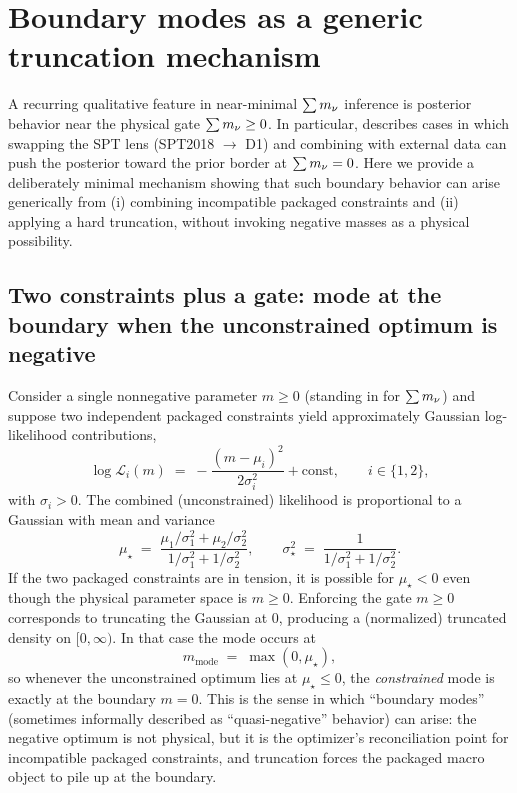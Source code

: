 \section{Boundary modes as a generic truncation mechanism}
\label{sec:boundary-mode}

A recurring qualitative feature in near-minimal $\sum m_\nu$ inference is posterior behavior near the physical gate $\sum m_\nu \ge 0$. In particular, \cite{arxiv2601_16277} describes cases in which swapping the SPT lens (SPT2018 $\rightarrow$ D1) and combining with external data can push the posterior toward the prior border at $\sum m_\nu=0$. Here we provide a deliberately minimal mechanism showing that such boundary behavior can arise generically from (i) combining incompatible packaged constraints and (ii) applying a hard truncation, without invoking negative masses as a physical possibility.

\subsection{Two constraints plus a gate: mode at the boundary when the unconstrained optimum is negative}
Consider a single nonnegative parameter $m \ge 0$ (standing in for $\sum m_\nu$) and suppose two independent packaged constraints yield approximately Gaussian log-likelihood contributions,
\begin{equation}
  \log \mathcal{L}_i(m) \;=\; -\frac{(m-\mu_i)^2}{2\sigma_i^2} + \text{const}, \qquad i\in\{1,2\},
  \label{eq:toy_gaussian_constraints}
\end{equation}
with $\sigma_i>0$. The combined (unconstrained) likelihood is proportional to a Gaussian with mean and variance
\begin{equation}
  \mu_\star \;=\; \frac{\mu_1/\sigma_1^2 + \mu_2/\sigma_2^2}{1/\sigma_1^2 + 1/\sigma_2^2},
  \qquad
  \sigma_\star^2 \;=\; \frac{1}{1/\sigma_1^2 + 1/\sigma_2^2}.
  \label{eq:toy_combined_gaussian}
\end{equation}
If the two packaged constraints are in tension, it is possible for $\mu_\star < 0$ even though the physical parameter space is $m\ge 0$. Enforcing the gate $m\ge 0$ corresponds to truncating the Gaussian at 0, producing a (normalized) truncated density on $[0,\infty)$. In that case the mode occurs at
\begin{equation}
  m_{\mathrm{mode}} \;=\; \max(0,\mu_\star),
  \label{eq:toy_trunc_mode}
\end{equation}
so whenever the unconstrained optimum lies at $\mu_\star \le 0$, the \emph{constrained} mode is exactly at the boundary $m=0$. This is the sense in which ``boundary modes'' (sometimes informally described as ``quasi-negative'' behavior) can arise: the negative optimum is not physical, but it is the optimizer's reconciliation point for incompatible packaged constraints, and truncation forces the packaged macro object to pile up at the boundary.

